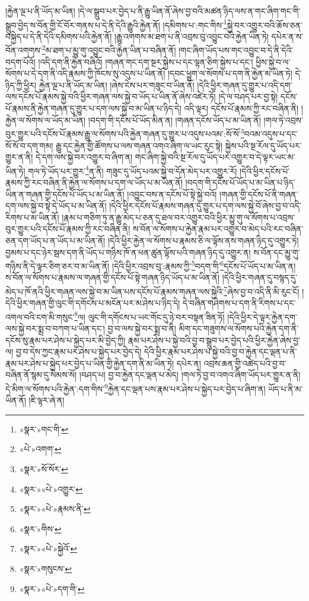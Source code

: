 །རྐྱེན་ལྔ་པ་ནི་ཡོད་མ་ཡིན། །དེ་ལ་སྒྲུབ་པར་བྱེད་པ་ནི་རྒྱུ་ཡིན་ནོ་ཞེས་བྱ་བའི་མཚན་ཉིད་ལས་ན་གང་ཞིག་གང་གི་སྒྲུབ་བྱེད་ས་བོན་གྱི་ངོ་བོར་གནས་པ་དེ་ནི་དེའི་རྒྱུའི་རྐྱེན་ནོ། །དམིགས་པ་:གང་གིས་\footnote{«སྣར་»གང་གི་}སྐྱེ་བར་འགྱུར་བའི་ཆོས་ཅན་བསྐྱེད་པ་དེ་ནི་དེའི་དམིགས་པའི་རྐྱེན་ནོ། །རྒྱུ་འགགས་མ་ཐག་པ་ནི་འབྲས་བུ་འབྱུང་བའི་རྐྱེན་ཡིན་ཏེ། དཔེར་ན་ས་བོན་འགགས་\footnote{«པེ་»འགག་}མ་ཐག་པ་མྱུ་གུ་འབྱུང་བའི་རྐྱེན་ཡིན་པ་བཞིན་ནོ། །གང་ཞིག་ཡོད་པས་གང་འབྱུང་བ་དེ་ནི་དེའི་བདག་པོའོ། །འདི་དག་ནི་རྐྱེན་བཞིའོ། །གཞན་གང་དག་སྔར་སྐྱེས་པ་དང་ལྷན་ཅིག་སྐྱེས་པ་དང་། ཕྱིས་སྐྱེ་བ་ལ་སོགས་པ་དེ་དག་ནི་འདི་རྣམས་ཀྱི་ཁོངས་སུ་འདུས་པ་ཡིན་ནོ། །དབང་ཕྱུག་ལ་སོགས་པ་དག་ནི་རྐྱེན་མ་ཡིན་ཏེ། དེ་ཉིད་ཀྱི་ཕྱིར། རྐྱེན་ལྔ་པ་ནི་ཡོད་མ་ཡིན། །ཞེས་ངེས་པར་གཟུང་བ་ཡིན་ནོ། །དེའི་ཕྱིར་གཞན་དུ་གྱུར་པ་འདི་དག་ལས་དངོས་པོ་རྣམས་སྐྱེ་བའི་ཕྱིར་གཞན་ལས་སྐྱེ་བ་ཡོད་པ་ཡིན་ནོ་ཞེས་འཛེར་ཏོ། །དེ་ལ་བཤད་པར་བྱ་སྟེ། དངོས་པོ་རྣམས་ནི་རྐྱེན་གཞན་དུ་གྱུར་པ་དག་ལས་སྐྱེ་བ་མ་ཡིན་པ་ཉིད་དེ། འདི་ལྟར། དངོས་པོ་རྣམས་ཀྱི་རང་བཞིན་ནི། །རྐྱེན་ལ་སོགས་ལ་ཡོད་མ་ཡིན། །བདག་གི་དངོས་པོ་ཡོད་མིན་ན། །གཞན་དངོས་ཡོད་པ་མ་ཡིན་ནོ། །གལ་ཏེ་འབྲས་བུར་གྱུར་པའི་དངོས་པོ་རྣམས་རྒྱུ་ལ་སོགས་པའི་རྐྱེན་གཞན་དུ་གྱུར་པ་འདུས་པའམ་:སོ་སོ་\footnote{«སྣར་»སོ་སོར་}བའམ་འདུས་པ་དང་སོ་སོ་བ་དག་གམ། རྒྱུ་དང་རྐྱེན་གྱི་ཚོགས་པ་ལས་གཞན་འགའ་ཞིག་ལ་ཡང་རུང་སྟེ། སྐྱེས་པའི་སྔ་རོལ་དུ་ཡོད་པར་གྱུར་ན་ནི། དེ་དག་ལས་སྐྱེ་བར་འགྱུར་བ་ཞིག་ན། གང་ཞིག་སྐྱེ་བའི་སྔ་རོལ་དུ་ཡོད་པར་འགྱུར་བ་དེ་ལྟར་ཡང་མ་ཡིན་ཏེ། གལ་ཏེ་ཡོད་པར་གྱུར་\footnote{«སྣར་»«པེ་»འགྱུར་}ན་ནི། གཟུང་དུ་ཡོད་པའམ་སྐྱེ་བ་དོན་མེད་པར་འགྱུར་རོ། །དེའི་ཕྱིར་དངོས་པོ་རྣམས་ཀྱི་རང་བཞིན་ནི་རྐྱེན་ལ་སོགས་པ་དག་ལ་ཡོད་པ་མ་ཡིན་ནོ། །བདག་གི་དངོས་པོ་ཡོད་པ་མ་ཡིན་པ་ཉིད་ཡིན་ན་གཞན་གྱི་དངོས་པོ་ཡོད་པ་མ་ཡིན་ནོ། །འབྱུང་བས་ན་དངོས་པོ་སྟེ་སྐྱེ་བའོ། །གཞན་གྱི་དངོས་པོ་ནི་གཞན་དག་ལས་སྐྱེ་བ་སྟེ་དེ་ཡོད་པ་མ་ཡིན་ནོ། །དེའི་ཕྱིར་དངོས་པོ་རྣམས་གཞན་དུ་གྱུར་པ་དག་ལས་སྐྱེ་བོ་ཞེས་བྱ་བ་འདི་རིགས་པ་མ་ཡིན་ནོ། །རྣམ་པ་གཅིག་ཏུ་ན་རྒྱུ་མེད་པ་ཅན་དུ་ཐལ་བར་འགྱུར་བའི་ཕྱིར་མྱུ་གུ་ལ་སོགས་པ་འབྲས་བུར་གྱུར་པའི་དངོས་པོ་རྣམས་ཀྱི་རང་བཞིན་ནི། ས་བོན་ལ་སོགས་པ་རྐྱེན་རྣམ་པར་འགྱུར་བ་མེད་པའི་རང་བཞིན་ཅན་དག་ཡོད་པ་ན་ཡོད་པ་མ་ཡིན་ནོ། །དེའི་ཕྱིར་རྐྱེན་ལ་སོགས་པ་རྣམས་ཅི་ལ་ལྟོས་ནས་གཞན་ཉིད་དུ་འགྱུར་ཏེ། བྱམས་པ་དང་ཉེར་སྦས་དག་ནི་ཡོད་པ་གཉིས་ཁོ་ན་ཕན་ཚུན་ལྟོས་པའི་གཞན་ཉིད་དུ་འགྱུར་ན། ས་བོན་དང་མྱུ་གུ་གཉིས་ནི་དེ་ལྟར་ཅིག་ཅར་བ་མ་ཡིན་ནོ། །དེའི་ཕྱིར་འབྲས་བུ་:རྣམས་ཀྱི་\footnote{«སྣར་»«པེ་»རྣམས་ནི་}བདག་གི་\footnote{«སྣར་»གིས་}དངོས་པོ་ཡོད་པ་མ་ཡིན་ན། ས་བོན་ལ་སོགས་པ་རྣམས་ལ་གཞན་གྱི་དངོས་པོ་སྟེ་གཞན་ཉིད་ཡོད་པ་མ་ཡིན་ནོ། །དེའི་ཕྱིར་གཞན་དུ་བསྙད་དུ་མེད་པ་ཁོ་ནའི་ཕྱིར་གཞན་ལས་སྐྱེ་བ་མ་ཡིན་པས་དངོས་པོ་རྣམས་གཞན་ལས་སྐྱེའི་\footnote{«སྣར་»«པེ་»སྐྱེའོ་}ཞེས་བྱ་བ་འདི་ནི་མི་རུང་ངོ། །དེའི་ཕྱིར་གཞན་གྱི་ལུང་གི་དགོངས་པ་མངོན་པར་མ་ཤེས་པ་ཉིད་དེ། དེ་བཞིན་གཤེགས་པ་དག་ནི་རིགས་པ་དང་འགལ་བའི་ངག་མི་གསུང་\footnote{«སྣར་»གསུངས་}ལ། ལུང་གི་དགོངས་པ་ཡང་གོང་དུ་ཉེ་བར་བསྟན་ཟིན་ཏོ། །དེའི་ཕྱིར་དེ་ལྟར་རྐྱེན་དག་ལས་སྐྱེ་བར་སྨྲ་བ་བཀག་པ་ཡིན་དང་། བྱ་བ་ལས་སྐྱེ་བར་སྨྲ་བ་ནི། མིག་དང་གཟུགས་ལ་སོགས་པའི་རྐྱེན་དག་ནི་དངོས་སུ་རྣམ་པར་ཤེས་པ་སྐྱེད་པར་མི་བྱེད་ཀྱི། རྣམ་པར་ཤེས་པ་སྐྱེ་བའི་བྱ་བ་སྒྲུབ་པར་བྱེད་པའི་ཕྱིར་རྐྱེན་ཞེས་བྱ་ལ། བྱ་བ་དེས་ཀྱང་རྣམ་པར་ཤེས་པ་སྐྱེད་པར་བྱེད་དེ། དེའི་ཕྱིར་རྣམ་པར་ཤེས་པ་སྐྱེ་བའི་བྱ་བ་རྐྱེན་དང་ལྡན་པ་ནི་རྣམ་པར་ཤེས་པ་སྐྱེད་པར་བྱེད་པ་ཡིན་གྱི་རྐྱེན་དག་ནི་མ་ཡིན་ཏེ། དཔེར་ན། འབྲས་ཆན་གྱི་འཚེད་པའི་བྱ་བ་བཞིན་ནོ་སྙམ་དུ་སེམས་སོ། །བཤད་པ། བྱ་བ་རྐྱེན་དང་ལྡན་པ་མེད། །གལ་ཏེ་བྱ་བ་འགའ་ཞིག་ཡོད་པར་གྱུར་ན་ནི། དེ་མིག་ལ་སོགས་པའི་རྐྱེན་:དག་གིས་\footnote{«སྣར་»«པེ་»དག་གི་}རྐྱེན་དང་ལྡན་པས་རྣམ་པར་ཤེས་པ་སྐྱེད་པར་བྱེད་པ་ཞིག་ན། ཡོད་པ་ནི་མ་ཡིན་ནོ། །ཇི་ལྟར་ཞེ་ན། 